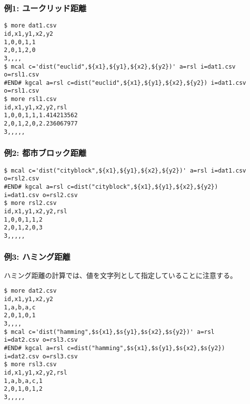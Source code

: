 \subsubsection*{例1: ユークリッド距離}



\begin{Verbatim}[baselinestretch=0.7,frame=single]
$ more dat1.csv
id,x1,y1,x2,y2
1,0,0,1,1
2,0,1,2,0
3,,,,
$ mcal c='dist("euclid",${x1},${y1},${x2},${y2})' a=rsl i=dat1.csv o=rsl1.csv
#END# kgcal a=rsl c=dist("euclid",${x1},${y1},${x2},${y2}) i=dat1.csv o=rsl1.csv
$ more rsl1.csv
id,x1,y1,x2,y2,rsl
1,0,0,1,1,1.414213562
2,0,1,2,0,2.236067977
3,,,,,
\end{Verbatim}
\subsubsection*{例2: 都市ブロック距離}



\begin{Verbatim}[baselinestretch=0.7,frame=single]
$ mcal c='dist("cityblock",${x1},${y1},${x2},${y2})' a=rsl i=dat1.csv o=rsl2.csv
#END# kgcal a=rsl c=dist("cityblock",${x1},${y1},${x2},${y2}) i=dat1.csv o=rsl2.csv
$ more rsl2.csv
id,x1,y1,x2,y2,rsl
1,0,0,1,1,2
2,0,1,2,0,3
3,,,,,
\end{Verbatim}
\subsubsection*{例3: ハミング距離}

ハミング距離の計算では、値を文字列として指定していることに注意する。


\begin{Verbatim}[baselinestretch=0.7,frame=single]
$ more dat2.csv
id,x1,y1,x2,y2
1,a,b,a,c
2,0,1,0,1
3,,,,
$ mcal c='dist("hamming",$s{x1},$s{y1},$s{x2},$s{y2})' a=rsl i=dat2.csv o=rsl3.csv
#END# kgcal a=rsl c=dist("hamming",$s{x1},$s{y1},$s{x2},$s{y2}) i=dat2.csv o=rsl3.csv
$ more rsl3.csv
id,x1,y1,x2,y2,rsl
1,a,b,a,c,1
2,0,1,0,1,2
3,,,,,
\end{Verbatim}
